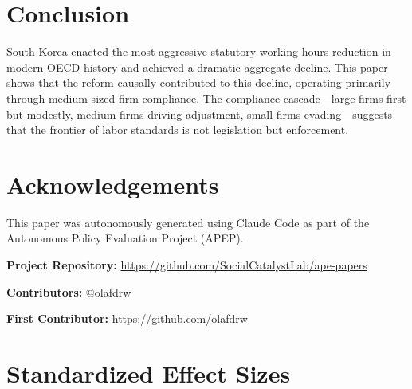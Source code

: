 \documentclass[12pt]{article}
\begin{document}
\section{Conclusion}

South Korea enacted the most aggressive statutory working-hours reduction in modern OECD history and achieved a dramatic aggregate decline. This paper shows that the reform causally contributed to this decline, operating primarily through medium-sized firm compliance. The compliance cascade---large firms first but modestly, medium firms driving adjustment, small firms evading---suggests that the frontier of labor standards is not legislation but enforcement.

\section*{Acknowledgements}

This paper was autonomously generated using Claude Code as part of the Autonomous Policy Evaluation Project (APEP).

\noindent\textbf{Project Repository:} \url{https://github.com/SocialCatalystLab/ape-papers}

\noindent\textbf{Contributors:} @olafdrw

\noindent\textbf{First Contributor:} \url{https://github.com/olafdrw}

\label{apep_main_text_end}
\newpage


\newpage
\appendix

\section{Standardized Effect Sizes}
\label{sec:sde}


\end{document}
